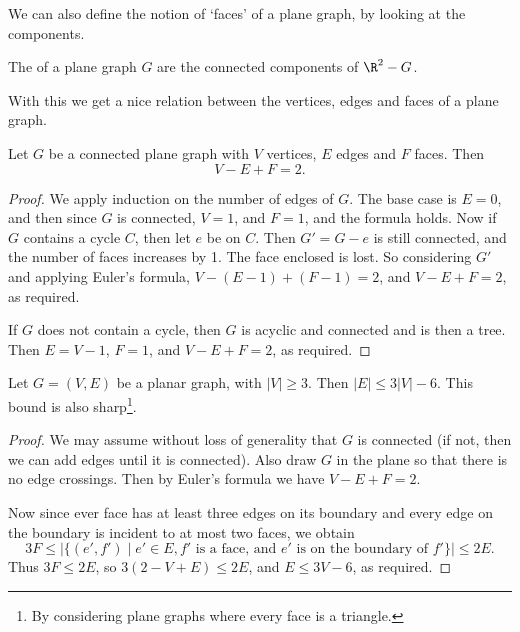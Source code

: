 We can also define the notion of `faces' of a plane graph, by looking at the components.

\begin{definition}[Faces]
	The  of a plane graph $G$ are the connected components of $\R^2 - G$.
\end{definition}

With this we get a nice relation between the vertices, edges and faces of a plane graph.

\begin{theorem}
	Let $G$ be a connected plane graph with $V$ vertices, $E$ edges and $F$ faces. Then
	$$
	V - E + F = 2.
	$$
\end{theorem}
\begin{proof}
	We apply induction on the number of edges of $G$. The base case is $E = 0$, and then since $G$ is connected, $V = 1$, and $F = 1$, and the formula holds. 
	Now if $G$ contains a cycle $C$, then let $e$ be on $C$. Then $G' = G - e$ is still connected, and the number of faces increases by 1. The face enclosed is lost. So considering $G'$ and applying Euler's formula, $V - (E - 1) + (F - 1) = 2$, and $V - E + F = 2$, 
	as required.

	If $G$ does not contain a cycle, then $G$ is acyclic and connected and is then a tree. Then $E = V - 1$, $F = 1$, and $V - E + F = 2$, as required.
\end{proof}

\begin{corollary}
	Let $G = (V, E)$ be a planar graph, with $|V| \geq 3$. Then $|E| \leq 3|V| - 6$. This bound is also sharp\footnote{By considering plane graphs where every face is a triangle.}.
\end{corollary}
\begin{proof}
	We may assume without loss of generality that $G$ is connected (if not, then we can add edges until it is connected). Also draw $G$ in the plane so that there is no edge crossings. Then by Euler's formula we have $V - E + F = 2$.

	Now since ever face has at least three edges on its boundary and every edge on the boundary is incident to at most two faces, we obtain
	$$
	3F \leq \left|\{(e', f') \mid e' \in E, f' \text{ is a face, and } e' \text{ is on the boundary of }f'\}\right| \leq 2E.
	$$
	Thus $3F \leq 2E$, so $3(2 - V + E) \leq 2E$, and $E \leq 3V - 6$, as required.
\end{proof}


